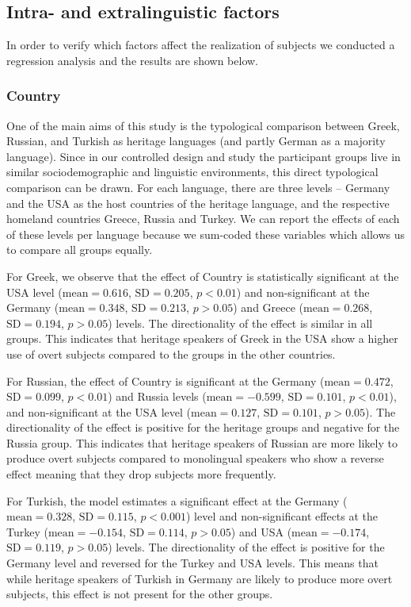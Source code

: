 \documentclass[output=paper,colorlinks,citecolor=brown]{langscibook}
\begin{document}
    \subsection{Intra- and extralinguistic factors} \label{sec:oezsoy:intraandextalinguisticfactors}
    In order to verify which factors affect the realization of subjects we conducted a regression analysis and the results are shown below.

\subsubsection{Country} \label{sec:oezsoy:Country}
One of the main aims of this study is the typological comparison between Greek, Russian, and Turkish as heritage languages (and partly German as a majority language). Since in our controlled design and study the participant groups live in similar sociodemographic and linguistic environments, this direct typological comparison can be drawn. For each language, there are three levels -- Germany and the USA as the host countries of the heritage language, and the respective homeland countries Greece, Russia and Turkey. We can report the effects of each of these levels per language because we sum-coded these variables which allows us to compare all groups equally.

For Greek, we observe that the effect of Country is statistically significant at the USA level ($\text{mean}=0.616$, $\text{SD}=0.205$, $p<0.01$) and non-significant at the Germany ($\text{mean}=0.348$, $\text{SD}=0.213$, $p>0.05$) and Greece ($\text{mean}=0.268$, $\text{SD}=0.194$, $p>0.05$) levels. The directionality of the effect is similar in all groups. This indicates that heritage speakers of Greek in the USA show a higher use of overt subjects compared to the groups in the other countries.

For Russian, the effect of Country is significant at the Germany ($\text{mean}=0.472$, $\text{SD}=0.099$, $p<0.01$) and Russia levels ($\text{mean}=-0.599$, $\text{SD}=0.101$, $p<0.01$), and non-significant at the USA level ($\text{mean}=0.127$, $\text{SD}=0.101$, $p>0.05$). The directionality of the effect is positive for the heritage groups and negative for the Russia group. This indicates that heritage speakers of Russian are more likely to produce overt subjects compared to monolingual speakers who show a reverse effect meaning that they drop subjects more frequently.

For Turkish, the model estimates a significant effect at the Germany ($\text{mean}=0.328$, $\text{SD}=0.115$, $p<0.001$) level and non-significant effects at the Turkey ($\text{mean}=-0.154$, $\text{SD}=0.114$, $p>0.05$) and USA ($\text{mean}=-0.174$, $\text{SD}=0.119$, $p>0.05$) levels. The directionality of the effect is positive for the Germany level and reversed for the Turkey and USA levels. This means that while heritage speakers of Turkish in Germany are likely to produce more overt subjects, this effect is not present for the other groups.
\end{document}
